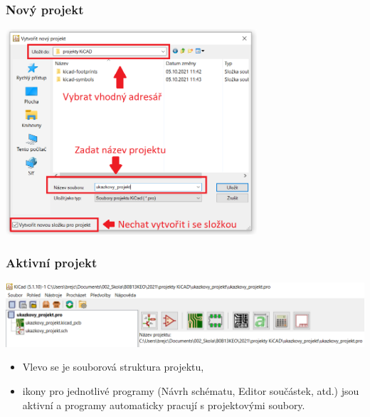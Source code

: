 \documentclass{beamer}
\begin{document}
\begin{frame}
	\frametitle{Nový projekt}

		\begin{center}
			\includegraphics[width=0.7\textwidth]{obr/prj_novy02.png}
		\end{center}
    
\end{frame}
\begin{frame}
	\frametitle{Aktivní projekt}

		\begin{center}
			\includegraphics[width=\textwidth]{obr/prj_novy03.png}
		\end{center}
    
		
		\begin{itemize}
			\item Vlevo se je souborová struktura projektu,
			\item ikony pro jednotlivé programy (Návrh schématu, Editor součástek, atd.) jsou aktivní a programy automaticky pracují s projektovými soubory.
		\end{itemize}
		
\end{frame}


\end{document}
